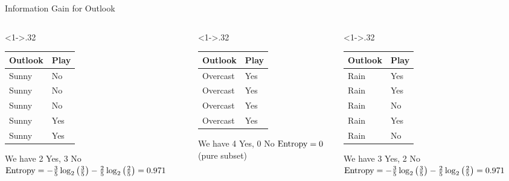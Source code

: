 \documentclass[dvipsnames]{beamer}
\begin{document}
\begin{frame}{Information Gain for Outlook}
\begin{columns}

\begin{column}<1->{.32\textwidth}
	\begin{table}
\begin{tabular}{l|l} \toprule
	\textbf{Outlook} & \textbf{Play} \\ \midrule
	Sunny    & No   \\
	Sunny    & No   \\
	Sunny    & No   \\
	Sunny    & Yes  \\
	Sunny    & Yes  \\

\bottomrule
\end{tabular}
We have 2 Yes, 3 No
$\operatorname{Entropy} = -\frac{3}{5} \log_2\left(\frac{3}{5}\right) - \frac{2}{5} \log_2\left(\frac{2}{5}\right) = 0.971$
\end{table}
\end{column}

\begin{column}<1->{.32\textwidth}
	\begin{table}
\begin{tabular}{l|l} \toprule
	\textbf{Outlook} & \textbf{Play} \\ \midrule

	Overcast & Yes  \\
	Overcast & Yes  \\
	Overcast & Yes  \\
	Overcast & Yes  \\ \bottomrule

\end{tabular}
We have 4 Yes, 0 No
$\operatorname{Entropy} = 0$ (pure subset)
	\end{table}
\end{column}

\begin{column}<1->{.32\textwidth}
	\begin{table}
\begin{tabular}{l|l} \toprule
	\textbf{Outlook} & \textbf{Play} \\ \midrule
	Rain     & Yes  \\
	Rain     & Yes  \\
	Rain     & No   \\
	Rain     & Yes  \\
	Rain     & No \\ \bottomrule
\end{tabular}
We have 3 Yes, 2 No
$\operatorname{Entropy} = -\frac{3}{5} \log_2\left(\frac{3}{5}\right) - \frac{2}{5} \log_2\left(\frac{2}{5}\right) = 0.971$
\end{table}
\end{column}
\end{columns}
\end{frame}
\end{document}
